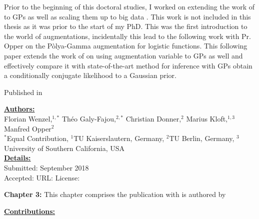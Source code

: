 


\graphicspath{{3/figures/}}

Prior to the beginning of this doctoral studies, I worked on extending the work of \citet{henaoBayesianNonlinearSupport2014} to \ac{GPs} as well as scaling them up to big data \cite{wenzel2017bayesian}.
This work is not included in this thesis as it was prior to the start of my PhD.
This was the first introduction to the world of augmentations, incidentally this lead to the following work with Pr. Opper on the P\`olya-Gamma augmentation for logistic functions.
This following paper extends the work of \citet{polsonBayesianInferenceLogistic2012} on using augmentation variable to \ac{GPs} as well and effectively compare it with state-of-the-art method for inference with \ac{GPs} obtain a conditionally conjugate likelihood to a Gaussian prior.

Published in 

\textbf{\underline{Authors:}}\\
Florian Wenzel,$^{1,*}$ Th\'eo Galy-Fajou,$^{2,*}$ Christian Donner,$^{2}$ Marius Kloft,$^{1,3}$ Manfred Opper$^2$\\
$^*$Equal Contribution, $^1$TU Kaiserslautern, Germany, $^2$TU Berlin, Germany, $^3$University of Southern California, USA\\

\textbf{\underline{Details:}}\\
Submitted: September 2018\\
Accepted: 
URL:
License:

\textbf{Chapter 3:} This chapter comprises the publication with is authored by 

\textbf{\underline{Contributions:}}\\

